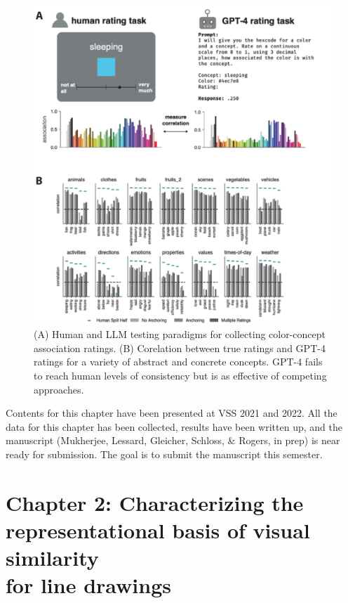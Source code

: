 \documentclass{Dissertate}
\begin{document}
\begin{figure}[htpb!]
    \centering
    \includegraphics[width=.8\linewidth]{proposal/figures/chap1b.pdf}
    \caption{(A) Human and LLM testing paradigms for collecting color-concept association ratings. (B) Corelation between true ratings and GPT-4 ratings for a variety of abstract and concrete concepts. GPT-4 fails to reach human levels of consistency but is as effective of competing approaches. }
    \label{fig:chap1b}
\end{figure}

\begin{tcolorbox}[
    colback=gray!10,  %
    colframe=black!50, %
    arc=4mm,         %
    boxrule=2pt      %
]
Contents for this chapter have been presented at VSS 2021 and 2022. All the data for this chapter has been collected, results have been written up, and the manuscript (Mukherjee, Lessard, Gleicher, Schloss, \& Rogers, in prep) is near ready for submission.
The goal is to submit the manuscript this semester.
\end{tcolorbox}

\section*{Chapter 2: Characterizing the representational basis of visual similarity \\ for line drawings}
\end{document}
